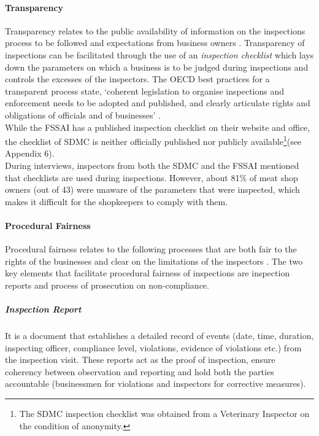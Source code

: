 \documentclass[a4paper, 12pt, twoside]{article}
\begin{document}
\paragraph{Transparency}

Transparency relates to the public availability of information on the inspections process to be followed and expectations from business owners \parencite{blancreport}. Transparency of inspections can be facilitated through the use of an \textit {inspection checklist} which lays down the parameters on which a business is to be judged during inspections and controls the excesses of the inspectors. The OECD best practices for a transparent process state, ‘coherent legislation to organise inspections and enforcement needs to be adopted and published, and clearly articulate rights and obligations of officials and of businesses’ \parencite{oecd1report}.\\

While the FSSAI has a published inspection checklist on their website and office, the checklist of SDMC is neither officially published nor publicly available\footnote{ The SDMC inspection checklist was obtained from a Veterinary Inspector on the condition of anonymity.}(see Appendix 6). \\

During interviews, inspectors from both the SDMC and the FSSAI mentioned that checklists are used during inspections. However, about 81\% of meat shop owners (out of 43) were unaware of the parameters that were inspected, which makes it difficult for the shopkeepers to comply with them. 

\paragraph{Procedural Fairness}

Procedural fairness relates to the following processes that are both fair to the rights of the businesses and clear on the limitations of the inspectors \parencite{oecdreport}. The two key elements that facilitate procedural fairness of inspections are inspection reports and process of prosecution on non-compliance.

\subparagraph{Inspection Report}

It is a document that establishes a detailed record of events (date, time, duration, inspecting officer, compliance level, violations, evidence of violations etc.) from the inspection visit. These reports act as the proof of inspection, ensure coherency between observation and reporting and hold both the parties accountable (businessmen for violations and inspectors for corrective measures). \\
\end{document}
